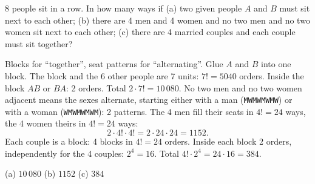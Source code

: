 
\begin{problem}
	8 people sit in a row. In how many ways if (a) two given people $A$ and
	$B$ must sit next to each other; (b) there are 4 men and 4 women and no two
	men and no two women sit next to each other; (c) there are 4 married
	couples and each couple must sit together?
\end{problem}

\begin{solution}
	\idea Blocks for ``together'', seat patterns for ``alternating''.
	 Glue $A$ and $B$ into one block. The block and the 6 other people
	are 7 units: $7!=5040$ orders. Inside the block $AB$ or $BA$: 2 orders.
	Total $2\cdot7!=10\,080$.
	 No two men and no two women adjacent means the sexes alternate,
	starting either with a man (\texttt{MWMWMWMW}) or with a woman
	(\texttt{WMWMWMWM}): 2 patterns. The 4 men fill their seats in $4!=24$
	ways, the 4 women theirs in $4!=24$ ways:
	\[ 2\cdot4!\cdot4!=2\cdot24\cdot24=1152. \]
	 Each couple is a block: 4 blocks in $4!=24$ orders. Inside each
	block 2 orders, independently for the 4 couples: $2^4=16$. Total
	$4!\cdot2^4=24\cdot16=384$.
	\begin{answer}
		(a) $10\,080$ \quad (b) $1152$ \quad (c) $384$
	\end{answer}
\end{solution}
